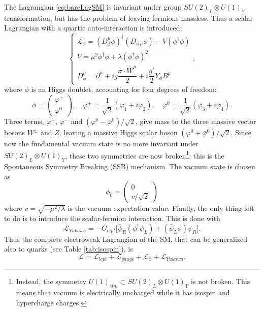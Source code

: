 The Lagrangian \ref{eq:bareLagSM} is invariant under group $SU(2)_{L} \otimes U(1)_{Y}$ transformation, but has the problem of leaving fermions massless. Thus a scalar Lagrangian with a quartic auto-interaction is introduced:
\begin{equation}\label{eq:lagScalar}
\left \{ \begin{array}{ll}
\mathcal{L}_{\phi} =  (D_{\phi}^{\mu} \phi)^{\dag}(D_{\phi\,\mu} \phi) - V(\phi^{\dag}\phi)\\
V = \mu^{2}\phi^{\dag}\phi + \lambda(\phi^{\dag}\phi)^{2}\\
D_{\phi}^{\mu} = \partial^{\mu} + ig\dfrac{\bar{\sigma}\cdot\bar{W}^{\mu}}{2} + i\dfrac{g'}{2}Y_{\phi}B^{\mu}
\end{array}\right. ,
\end{equation}where $\phi$ is an Higgs doublet, accounting for four degrees of freedom:\begin{equation}\label{eq:higgsDoub}
\phi = \begin{pmatrix} \varphi^{+}\\\varphi^{0}
\end{pmatrix},\quad \varphi^{+}=\frac{1}{\sqrt{2}}(\varphi_{1}+i\varphi_{2}),\quad \varphi^{0}=\frac{1}{\sqrt{2}}(\varphi_{3}+i\varphi_{4}).
\end{equation}
Three terms, $\varphi^{+}$, $\varphi^{-}$ and $(\varphi^{0}-\bar\varphi^{0})/\sqrt{2}$, give mass to the three massive vector bosons $W^{\pm}$ and $Z$, leaving a massive Higgs scalar boson $(\varphi^{0}+\bar\varphi^{0})/\sqrt{2}$. Since now the fundamental vacuum state is no more invariant under $SU(2)_{L} \otimes U(1)_{Y}$, these two symmetries are now broken\footnote{Instead, the symmetry $U(1)_{elm} \subset SU(2)_{L} \otimes U(1)_{Y}$ is not broken. This means that vacuum is electrically uncharged while it has isospin and hypercharge charges.}: this is the Spontaneous Symmetry Breaking (SSB) mechanism. The vacuum state is chosen as\begin{equation}\label{eq:vacuum}
\phi_{0} = \begin{pmatrix} 0 \\ v/\sqrt{2}
\end{pmatrix}
\end{equation}where $v = \sqrt{-\mu^{2}/\lambda}$ is the vacuum expectation value. Finally, the only thing left to do is to introduce the scalar-fermion interaction. This is done with
\begin{equation}\label{eq:lagYukawa}
\mathcal{L}_{Yukawa} = -G_{lept}\big[\bar\psi_{R}(\phi^{\dag}\psi_{L}) + (\bar\psi_{L}\phi)\psi_{R}\big] .
\end{equation}Thus the complete electroweak Lagrangian of the SM, that can be generalized also to quarks (see Table \ref{tab:isospin}), is\begin{equation}\label{eq:lagSM}
\mathcal{L}= \mathcal{L}_{lept} +\mathcal{L}_{gauge} +\mathcal{L}_{\phi} +\mathcal{L}_{Yukawa}.
\end{equation}


